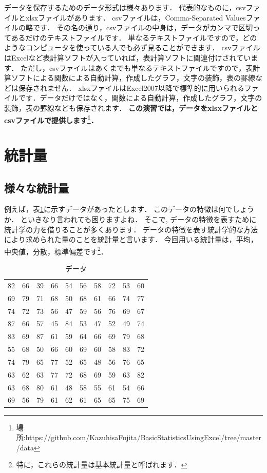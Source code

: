 データを保存するためのデータ形式は様々あります．
代表的なものに，csvファイルとxlsxファイルがあります．
csvファイルは，Comma-Separated Valuesファイルの略です．
その名の通り，csvファイルの中身は，データがカンマで区切ってあるだけのテキストファイルです．
単なるテキストファイルですので，どのようなコンピュータを使っている人でも必ず見ることができます．
csvファイルはExcelなど表計算ソフトが入っていれば，表計算ソフトに関連付けされています．
ただし，csvファイルはあくまでも単なるテキストファイルですので，表計算ソフトによる関数による自動計算，作成したグラフ，文字の装飾，表の罫線などは保存されません．
xlsxファイルはExcel2007以降で標準的に用いられるファイルです．データだけではなく，関数による自動計算，作成したグラフ，文字の装飾，表の罫線なども保存されます．
{\bf この演習では，データをxlsxファイルとcsvファイルで提供します\footnote{場所:https://github.com/KazuhisaFujita/BasicStatisticsUsingExcel/tree/master/data}．}

\section{統計量}

\subsection{様々な統計量}

例えば，表\ref{tab:sample}に示すデータがあったとします．
このデータの特徴は何でしょうか．
といきなり言われても困りますよね．
そこで, データの特徴を表すために統計学の力を借りることが多くあります．
データの特徴を表す統計学的な方法により求められた量のことを統計量と言います．
今回用いる統計量は，平均，中央値，分散，標準偏差です\footnote{特に，これらの統計量は基本統計量と呼ばれます．}．

\begin{table}[tb]
    \caption{データ}
    \centering
    \begin{tabular}{cccccccccc}
       82 & 66 & 39 & 66 & 54 & 56 & 58 & 72 & 53 & 60 \\
       69 & 79 & 71 & 68 & 50 & 68 & 61 & 66 & 74 & 77 \\
       74 & 72 & 73 & 56 & 47 & 59 & 56 & 76 & 69 & 67 \\
       87 & 66 & 57 & 45 & 84 & 53 & 47 & 52 & 49 & 74 \\
       83 & 69 & 87 & 61 & 59 & 64 & 66 & 69 & 79 & 68 \\
       55 & 68 & 50 & 66 & 60 & 69 & 60 & 58 & 83 & 72 \\
       74 & 79 & 65 & 77 & 52 & 65 & 48 & 56 & 76 & 65 \\
       63 & 62 & 63 & 77 & 72 & 68 & 69 & 59 & 63 & 82 \\
       63 & 68 & 80 & 61 & 48 & 58 & 55 & 61 & 54 & 66 \\
       69 & 56 & 79 & 61 & 62 & 61 & 65 & 65 & 75 & 69 \\
    \end{tabular}
    \label{tab:sample}
\end{table}

